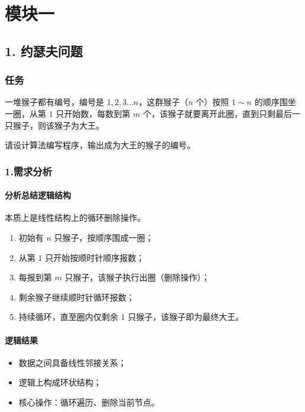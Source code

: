 \documentclass{ctexart}
\begin{document}
\newpage


\tableofcontents
\newpage


\section{模块一}
\subsection{1. 约瑟夫问题}
\subsubsection{任务}

一堆猴子都有编号，编号是 $1,2,3 \dots n$，这群猴子（$n$ 个）按照 $1 \sim n$ 的顺序围坐一圈，从第 $1$ 只开始数，每数到第 $m$ 个，该猴子就要离开此圈，直到只剩最后一只猴子，则该猴子为大王。

请设计算法编写程序，输出成为大王的猴子的编号。

\subsubsection{1.需求分析}
\paragraph{分析总结逻辑结构}
本质上是线性结构上的循环删除操作。
\begin{enumerate}
    \item 初始有 $n$ 只猴子，按顺序围成一圈；
    \item 从第 $1$ 只开始按顺时针顺序报数；
    \item 每报到第 $m$ 只猴子，该猴子执行出圈（删除操作）；
    \item 剩余猴子继续顺时针循环报数；
    \item 持续循环，直至圈内仅剩余 $1$ 只猴子，该猴子即为最终大王。
\end{enumerate}

\paragraph{逻辑结果}
\begin{itemize}
    \item 数据之间具备线性邻接关系；
    \item 逻辑上构成环状结构；
    \item 核心操作：循环遍历、删除当前节点。
\end{itemize}
\end{document}
